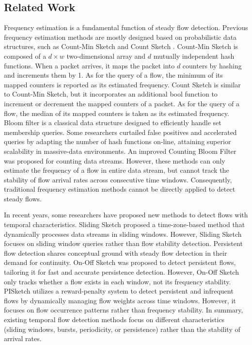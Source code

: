 \documentclass[preprint,12pt]{elsarticle}
\begin{document}
\subsection{Related Work}
Frequency estimation is a fundamental function of steady flow detection. Previous frequency estimation methods are mostly designed based on probabilistic data structures, such as Count-Min Sketch \cite{b24} and Count Sketch \cite{b25}. Count-Min Sketch is composed of a $d \times w$ two-dimensional array and $d$ mutually independent hash functions. When a packet arrives, it maps the packet into $d$ counters by hashing and increments them by 1. As for the query of a flow, the minimum of its mapped counters is reported as its estimated frequency. Count Sketch is similar to Count-Min Sketch, but it incorporates an additional bool function to increment or decrement the mapped counters of a packet. As for the query of a flow, the median of its mapped counters is taken as its estimated frequency. Bloom filter \cite{b26} is a classical data structure designed to efficiently handle set membership queries. Some researchers \cite{b27} curtailed false positives and accelerated queries by adapting the number of hash functions on-line, attaining superior scalability in massive-data environments. An improved Counting Bloom Filter \cite{b28} was proposed for counting data streams. However, these methods can only estimate the frequency of a flow in entire data stream, but cannot track the stability of flow arrival rates across consecutive time windows. Consequently, traditional frequency estimation methods cannot be directly applied to detect steady flows.

In recent years, some researchers have proposed new methods to detect flows with temporal characteristics. Sliding Sketch \cite{b29} proposed a time-zone-based method that dynamically processes data streams in sliding windows. However, Sliding Sketch focuses on sliding window queries rather than flow stability detection. Persistent flow detection shares conceptual ground with steady flow detection in their demand for continuity. On-Off Sketch \cite{b22} was proposed to detect persistent flows, tailoring it for fast and accurate persistence detection. However, On-Off Sketch only tracks whether a flow exists in each window, not its frequency stability. PISketch \cite{b19} utilizes a reward-penalty system to detect persistent and infrequent flows by dynamically managing flow weights across time windows. However, it focuses on flow occurrence patterns rather than frequency stability. In summary, existing temporal flow detection methods focus on different characteristics (sliding windows, bursts, periodicity, or persistence) rather than the stability of arrival rates.
\end{document}
